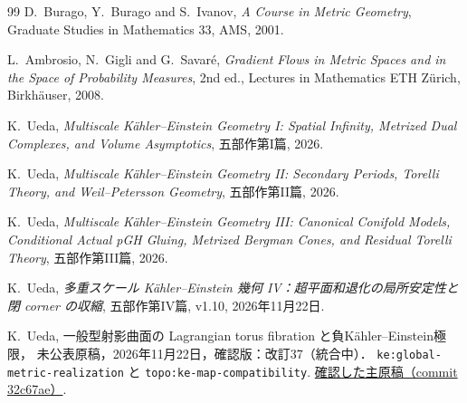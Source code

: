 \documentclass[a4paper,11pt]{ltjsarticle}
\numberwithin{equation}{section}
\theoremstyle{plain}
\theoremstyle{definition}
\theoremstyle{remark}
\begin{document}
\begin{thebibliography}{99}
D.~Burago, Y.~Burago and S.~Ivanov,
\newblock \emph{A Course in Metric Geometry},
\newblock Graduate Studies in Mathematics 33, AMS, 2001.

L.~Ambrosio, N.~Gigli and G.~Savar\'e,
\newblock \emph{Gradient Flows in Metric Spaces and in the Space of Probability Measures},
\newblock 2nd ed., Lectures in Mathematics ETH Z\"urich, Birkh\"auser, 2008.

K.~Ueda,
\newblock \emph{Multiscale Kähler--Einstein Geometry I: Spatial Infinity, Metrized Dual Complexes, and Volume Asymptotics},
\newblock 五部作第I篇, 2026.

K.~Ueda,
\newblock \emph{Multiscale Kähler--Einstein Geometry II: Secondary Periods, Torelli Theory, and Weil--Petersson Geometry},
\newblock 五部作第II篇, 2026.

K.~Ueda,
\newblock \emph{Multiscale Kähler--Einstein Geometry III: Canonical Conifold Models, Conditional Actual pGH Gluing, Metrized Bergman Cones, and Residual Torelli Theory},
\newblock 五部作第III篇, 2026.

K.~Ueda,
\newblock \emph{多重スケール Kähler--Einstein 幾何 IV：超平面和退化の局所安定性と閉 corner の収縮},
\newblock 五部作第IV篇, v1.10, 2026年11月22日.

K.~Ueda,
\newblock 一般型射影曲面の Lagrangian torus fibration と負Kähler--Einstein極限，
\newblock 未公表原稿，2026年11月22日，確認版：改訂37（統合中）．
\newblock \texttt{ke:global-metric-realization} と \texttt{topo:ke-map-compatibility}.
\newblock \href{https://github.com/uedakazushi/surface-lagrangian-torus-fibration/blob/32c67aefe6beb47c2955923e2b6eb2471d48af31/papers/surface-lagrangian-torus-fibration.tex}{確認した主原稿（commit 32c67ae）}.

\end{thebibliography}
\end{document}
